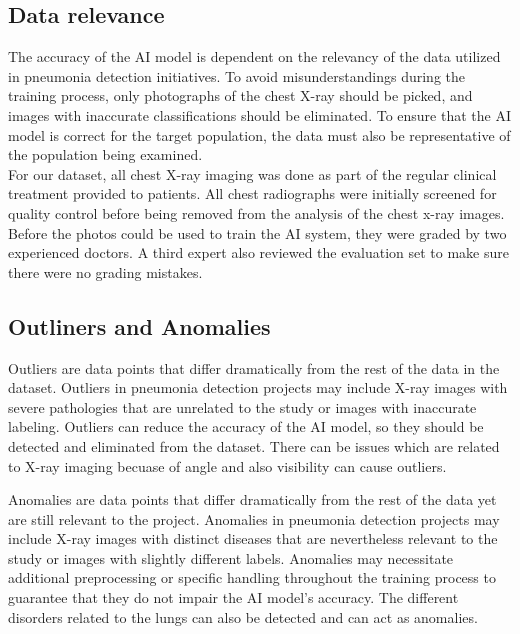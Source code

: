 \subsection{Data relevance}

The accuracy of the AI model is dependent on the relevancy of the data utilized in pneumonia detection initiatives. To avoid misunderstandings during the training process, only photographs of the chest X-ray should be picked, and images with inaccurate classifications should be eliminated. To ensure that the AI model is correct for the target population, the data must also be representative of the population being examined.\\

For our dataset, all chest X-ray imaging was done as part of the regular clinical treatment provided to patients. All chest radiographs were initially screened for quality control before being removed from the analysis of the chest x-ray images. Before the photos could be used to train the AI system, they were graded by two experienced doctors. A third expert also reviewed the evaluation set to make sure there were no grading mistakes.\autocite{Kermany:2018}

\subsection{Outliners and Anomalies}

Outliers are data points that differ dramatically from the rest of the data in the dataset. Outliers in pneumonia detection projects may include X-ray images with severe pathologies that are unrelated to the study or images with inaccurate labeling. Outliers can reduce the accuracy of the AI model, so they should be detected and eliminated from the dataset. There can be issues which are related to X-ray imaging becuase of angle and also visibility can cause outliers.\cite{Wang:2020}

Anomalies are data points that differ dramatically from the rest of the data yet are still relevant to the project. Anomalies in pneumonia detection projects may include X-ray images with distinct diseases that are nevertheless relevant to the study or images with slightly different labels. Anomalies may necessitate additional preprocessing or specific handling throughout the training process to guarantee that they do not impair the AI model's accuracy. The different disorders related to the lungs can also be detected and can act as anomalies.\\

